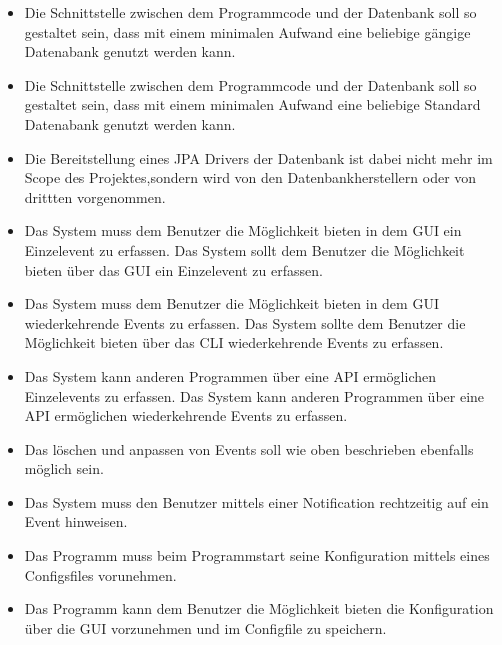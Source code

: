 \documentclass[11pt,titelpage]{scrreprt}
\begin{document}
\begin{itemize}

\item Die Schnittstelle zwischen dem Programmcode und der Datenbank soll so gestaltet sein, dass mit einem minimalen Aufwand eine beliebige gängige Datenabank genutzt werden kann.

\item
Die Schnittstelle zwischen dem Programmcode und der Datenbank soll so gestaltet sein, dass mit einem minimalen Aufwand eine beliebige Standard Datenabank genutzt werden kann.

\item
Die Bereitstellung eines JPA Drivers der Datenbank ist dabei nicht mehr im Scope des Projektes,sondern wird von den Datenbankherstellern oder von drittten vorgenommen.

\item
Das System muss dem Benutzer die Möglichkeit bieten in dem GUI ein Einzelevent zu erfassen.
Das System sollt dem Benutzer die Möglichkeit bieten über das GUI ein Einzelevent zu erfassen.

\item
Das System muss dem Benutzer die Möglichkeit bieten in dem GUI wiederkehrende Events zu erfassen.
Das System sollte dem Benutzer die Möglichkeit bieten über das CLI wiederkehrende Events zu erfassen.

\item
Das System kann anderen Programmen über eine API ermöglichen Einzelevents zu erfassen.
Das System kann anderen Programmen über eine API ermöglichen wiederkehrende Events zu erfassen.

\item
Das löschen und anpassen von Events soll wie oben beschrieben ebenfalls möglich sein.

\item
Das System muss den Benutzer mittels einer Notification rechtzeitig auf ein Event hinweisen.

\item
Das Programm muss beim Programmstart seine Konfiguration mittels eines Configsfiles vorunehmen.



\item
Das Programm kann dem Benutzer die Möglichkeit bieten die Konfiguration über die GUI vorzunehmen und im Configfile zu speichern.


\end{itemize}
\end{document}
